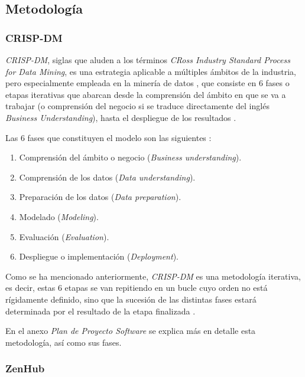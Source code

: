 \subsection{Metodología}

\subsubsection{CRISP-DM}

\textit{CRISP-DM}, siglas que aluden a los términos \textit{CRoss Industry Standard Process for Data Mining}, es una estrategia aplicable a múltiples ámbitos de la industria, pero especialmente empleada en la minería de datos \cite{crispdm:azevedo}, que consiste en 6 fases o etapas iterativas que abarcan desde la comprensión del ámbito en que se va a trabajar (o comprensión del negocio si se traduce directamente del inglés \textit{Business Understanding}), hasta el despliegue de los resultados \cite{crispdm:niaksu,crispdm:schorer}.

Las 6 fases que constituyen el modelo son las siguientes \cite{crispdm:niaksu,crispdm:schorer}:
\begin{enumerate}[itemsep=0.1em]
    \item Comprensión del ámbito o negocio (\textit{Business understanding}).
    \item Comprensión de los datos (\textit{Data understanding}).
    \item Preparación de los datos (\textit{Data preparation}).
    \item Modelado (\textit{Modeling}).
    \item Evaluación (\textit{Evaluation}).
    \item Despliegue o implementación (\textit{Deployment}).
\end{enumerate}

Como se ha mencionado anteriormente, \textit{CRISP-DM} es una metodología iterativa, es decir, estas 6 etapas se van repitiendo en un bucle cuyo orden no está rígidamente definido, sino que la sucesión de las distintas fases estará determinada por el resultado de la etapa finalizada \cite{crispdm:niaksu}.

En el anexo \textit{Plan de Proyecto Software} se explica más en detalle esta metodología, así como sus fases.

\subsubsection{ZenHub}


